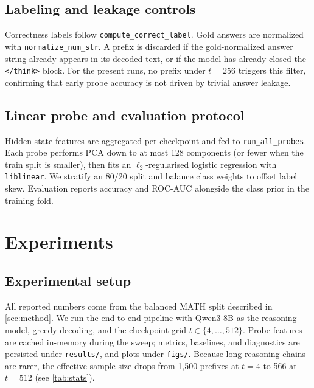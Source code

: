 \documentclass[10pt,a4paper,twocolumn]{article}
\begin{document}
\subsection{Labeling and leakage controls}
Correctness labels follow \texttt{compute\_correct\_label}.  Gold answers are normalized with \texttt{normalize\_num\_str}. A prefix is discarded if the gold-normalized answer string already appears in its decoded text, or if the model has already closed the \verb|</think>| block.  For the present runs, no prefix under $t{=}256$ triggers this filter, confirming that early probe accuracy is not driven by trivial answer leakage.

\subsection{Linear probe and evaluation protocol}
Hidden-state features are aggregated per checkpoint and fed to \texttt{run\_all\_probes}.  Each probe performs PCA down to at most 128 components (or fewer when the train split is smaller), then fits an $\ell_2$-regularised logistic regression with \texttt{liblinear}.  We stratify an 80/20 split and balance class weights to offset label skew.  Evaluation reports accuracy and ROC-AUC alongside the class prior in the training fold.


\section{Experiments}
\label{sec:experiments}

\subsection{Experimental setup}
All reported numbers come from the balanced MATH split described in \cref{sec:method}.  We run the end-to-end pipeline with Qwen3-8B as the reasoning model, greedy decoding, and the checkpoint grid $t \in \{4,\ldots,512\}$.  Probe features are cached in-memory during the sweep; metrics, baselines, and diagnostics are persisted under \texttt{results/}, and plots under \texttt{figs/}. Because long reasoning chains are rarer, the effective sample size drops from 1{,}500 prefixes at $t{=}4$ to 566 at $t{=}512$ (see \cref{tab:stats}).
\end{document}
